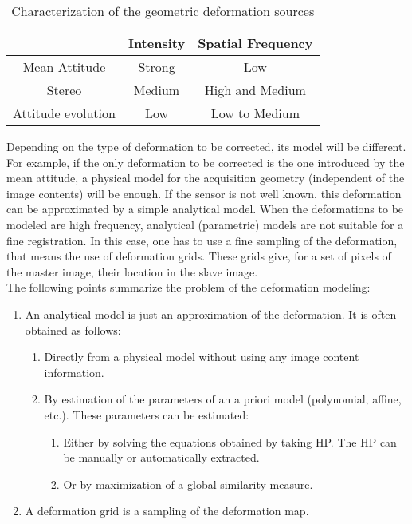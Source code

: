 \begin{table}[b]
\begin{center}
\begin{tabular}{|c|c|c|}
\hline
& Intensity & Spatial Frequency\\
\hline
Mean Attitude & Strong & Low \\
\hline
Stereo & Medium & High and Medium\\
\hline
Attitude evolution & Low & Low to Medium \\
\hline
\end{tabular}
\end{center}
\caption{Characterization of the geometric deformation sources}
\label{tab-deform}
\end{table}

Depending on the type of deformation to be corrected, its model will be
different. For example, if the only deformation to be corrected is the
one introduced by the mean attitude, a physical model for the
acquisition geometry (independent of the image contents) will be
enough. If the sensor is not well known, this deformation can be
approximated by a simple analytical model. When the deformations to be
modeled are high frequency, analytical (parametric) models are not
suitable for a fine registration. In this case, one has to use a fine
sampling of the deformation, that means the use of deformation
grids. These grids give, for a set of pixels of the master image,
their location in the slave image.\\

The following points summarize the problem of the deformation modeling:
\begin{enumerate}
\item An analytical model is just an approximation of the
deformation. It is often obtained as follows:
\begin{enumerate}
\item Directly from a physical model without using any image content information.
\item By estimation of the parameters of an a priori model
(polynomial, affine, etc.). These parameters can be estimated:
\begin{enumerate}
\item Either by solving the equations obtained by taking HP. The HP can be manually or automatically extracted.
\item Or by maximization of a global similarity measure.
\end{enumerate}

\end{enumerate}
\item A deformation grid is a sampling of the deformation map.
\end{enumerate}

